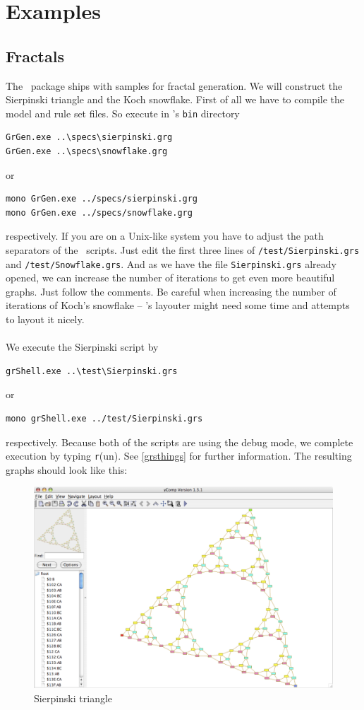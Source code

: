 \chapter{Examples}
\label{anexample}

\section{Fractals}
\label{fractals}
The \GrG\ package ships with samples for fractal generation. We will construct the Sierpinski triangle and the Koch snowflake. First of all we have to compile the model and rule set files. So execute in \GrG's \texttt{bin} directory
\begin{verbatim}
GrGen.exe ..\specs\sierpinski.grg
GrGen.exe ..\specs\snowflake.grg
\end{verbatim}
or
\begin{verbatim}
mono GrGen.exe ../specs/sierpinski.grg
mono GrGen.exe ../specs/snowflake.grg
\end{verbatim}
respectively. If you are on a Unix-like system you have to adjust the path separators of the \GrShell\ scripts. Just edit the first three lines of \texttt{/test/Sierpinski.grs} and \texttt{/test/Snowflake.grs}. And as we have the file \texttt{Sierpinski.grs} already opened, we can increase the number of iterations to get even more beautiful graphs. Just follow the comments. Be careful when increasing the number of iterations of Koch's snowflake -- \yComp's layouter might need some time and attempts to layout it nicely.\\
\\
We execute the Sierpinski script by
\begin{verbatim}
grShell.exe ..\test\Sierpinski.grs
\end{verbatim}
or
\begin{verbatim}
mono grShell.exe ../test/Sierpinski.grs
\end{verbatim}
respectively. Because both of the scripts are using the debug mode, we complete execution by typing \texttt{r}(un). See \ref{grsthings} for further information. The resulting graphs should look like this:
\begin{figure}[htbp]
  \centering
  \includegraphics[width=0.8\linewidth]{fig/sierpinski}
  \caption{Sierpinski triangle}
\end{figure}
